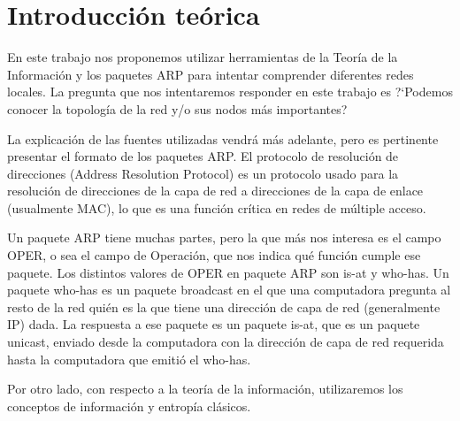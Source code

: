 \section{Introducci\'on te\'orica}

\PARstart En este trabajo nos proponemos utilizar herramientas de la Teor\'ia de la Informaci\'on y los paquetes ARP para intentar comprender diferentes redes locales. La pregunta que nos intentaremos responder en este trabajo es ?`Podemos conocer la topolog\'ia de la red y/o sus nodos m\'as importantes?

La explicaci\'on de las fuentes utilizadas vendr\'a m\'as adelante, pero es pertinente presentar el formato de los paquetes ARP. El protocolo de resoluci\'on de direcciones (Address Resolution Protocol) \cite{arp} es un protocolo usado para la resoluci\'on de direcciones de la capa de red a direcciones de la capa de enlace (usualmente MAC), lo que es una funci\'on cr\'itica en redes de m\'ultiple acceso.

Un paquete ARP tiene muchas partes, pero la que m\'as nos interesa es el campo OPER, o sea el campo de Operaci\'on, que nos indica qu\'e funci\'on cumple ese paquete. 
Los distintos valores de OPER en paquete ARP son is-at y who-has. 
Un paquete who-has es un paquete broadcast en el que una computadora pregunta al resto de la red qui\'en es la que tiene una direcci\'on de capa de red (generalmente IP) dada.
La respuesta a ese paquete es un paquete is-at, que es un paquete unicast, enviado desde la computadora con la direcci\'on de capa de red requerida hasta la computadora que emiti\'o el who-has.

Por otro lado, con respecto a la teor\'ia de la informaci\'on, utilizaremos los conceptos de informaci\'on y entrop\'ia cl\'asicos.
